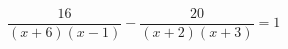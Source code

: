 \begin{ex}[type=equation]
	\begin{condition}
		$\dfrac{16}{(x+ 6)(x - 1)} - \dfrac{20}{(x + 2)(x + 3)} = 1$
	\end{condition}
\end{ex}